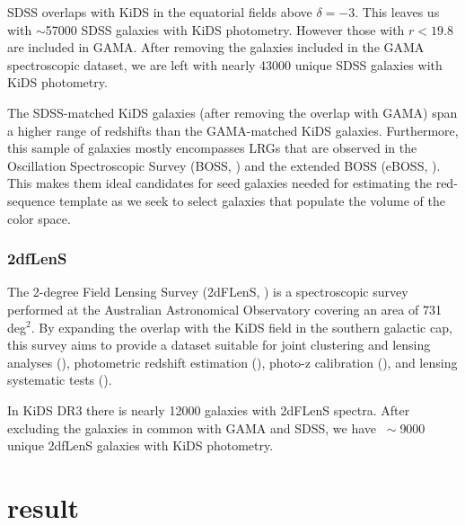 \documentclass[fleqn,usenatbib]{mnras}
\begin{document}
SDSS overlaps with KiDS in the equatorial fields above $\delta =-3$. This leaves us with $\sim$57000 SDSS galaxies with KiDS photometry. However those with $r<19.8$ are included in GAMA. After removing the galaxies included in the GAMA spectroscopic dataset, we are left with nearly 43000 unique SDSS galaxies with KiDS photometry. 

The SDSS-matched KiDS galaxies (after removing the overlap with GAMA) span a higher range of redshifts than the GAMA-matched KiDS galaxies. Furthermore, this sample of galaxies mostly encompasses LRGs that are observed in the Oscillation Spectroscopic Survey (BOSS, \citealt{dawson2013}) and the extended BOSS (eBOSS, \citealt{dawson2016}). This makes them ideal candidates for seed galaxies needed for estimating the red-sequence template as we seek to select galaxies that populate the volume of the color space.

\subsubsection{2dfLenS}

The 2-degree Field Lensing Survey (2dFLenS, \citealt{blake2016}) is a spectroscopic survey performed at the Australian Astronomical Observatory covering an area of 731 deg$^2$. By expanding the overlap with the KiDS field in the southern galactic cap, this survey aims to provide a dataset suitable for joint clustering and lensing analyses (\citealt{amon2017,joudaki2018}), photometric redshift estimation (\citealt{kids_annz}), photo-z calibration (\citealt{johnson2017,wolf2017}), and lensing systematic tests (\citealt{amon2018}).

In KiDS DR3 there is nearly 12000 galaxies with 2dFLenS spectra. After excluding the galaxies in common with GAMA and SDSS, we have $~\sim $9000 unique 2dfLenS galaxies with KiDS photometry. 






\section{result}
\end{document}

